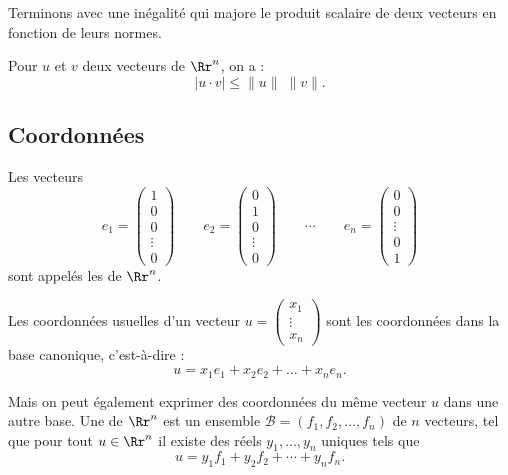\documentclass[11pt,class=report,crop=false]{standalone}
\begin{document}
Terminons avec une inégalité qui majore le produit scalaire de deux vecteurs en fonction de leurs normes.
\begin{theoreme}
    Pour $u$ et $v$ deux vecteurs de $\Rr^n$, on a :
$$ | u \cdot v | \le \| u \| \; \| v \|.$$
\end{theoreme}


\subsection{Coordonnées}

\begin{definition}
Les vecteurs
$$
e_1 = \begin{pmatrix} 1\\0\\0\\\vdots\\0\end{pmatrix}\qquad
e_2 = \begin{pmatrix} 0\\1\\0\\\vdots\\0\end{pmatrix}\qquad\cdots\qquad
e_n = \begin{pmatrix} 0\\0\\\vdots\\0\\1\end{pmatrix}
$$
sont appelés les  de $\Rr^n$.
\end{definition}

Les coordonnées usuelles d'un vecteur $u = \left(\begin{smallmatrix} x_1\\ \vdots \\ x_n \end{smallmatrix}\right)$ sont les coordonnées dans la base canonique, c'est-à-dire :
$$u = x_1 e_1 + x_2 e_2 + \dots + x_n e_n.$$

Mais on peut également exprimer des coordonnées du même vecteur $u$ dans une autre base.
Une  de $\Rr^n$ est un ensemble $\mathcal{B} = (f_1, f_2, \ldots, f_n)$ de $n$ vecteurs, tel que 
pour tout $u \in \Rr^n$ il existe des réels $y_1, \ldots, y_n$ uniques tels que
$$u = y_1 f_1 + y_2 f_2 + \cdots + y_n f_n.$$
\end{document}

